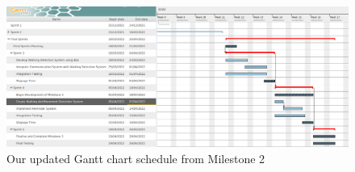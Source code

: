\begin{figure}[H]
	\centering
	\captionsetup{width=1.0\linewidth}


	\includegraphics[width=1.0\linewidth]{graphics/ganttm2.png}

	\caption[Milestone 2 Gantt Chart]{Our updated Gantt chart schedule from Milestone 2 \cite{mile2}}

	\label{fig:ganttm2}

\end{figure}